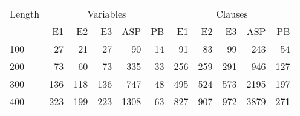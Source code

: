 
\begin{center}
\begin{tabular}{ l|rrrrr|rrrrr }
 Length & \multicolumn{5}{c|}{Variables}& \multicolumn{5}{c}{Clauses} \\
 &\;\;\;E1 &\;\;\;E2 &\;\;\;E3 &\;\;\;ASP &\;\;\;PB &\;\;\;E1	&\;\;\;E2	&\;\;\;E3	&\;\;\;ASP	&\;\;\;PB\\
    \hline
100	&27     &21	    &27     &90     &14 &91	  &83	&99	  &243	&54 \\ 
200	&73 	&60	    &73	    &335	&33 &256  &259	&291  &946  &127\\
300	&136    &118    &136    &747    &48 &495  &524	&573  &2195	&197\\
400	&223    &199	&223    &1308   &63 &827  &907	&972  &3879 &271\\
    \hline
\end{tabular}
\end{center}

